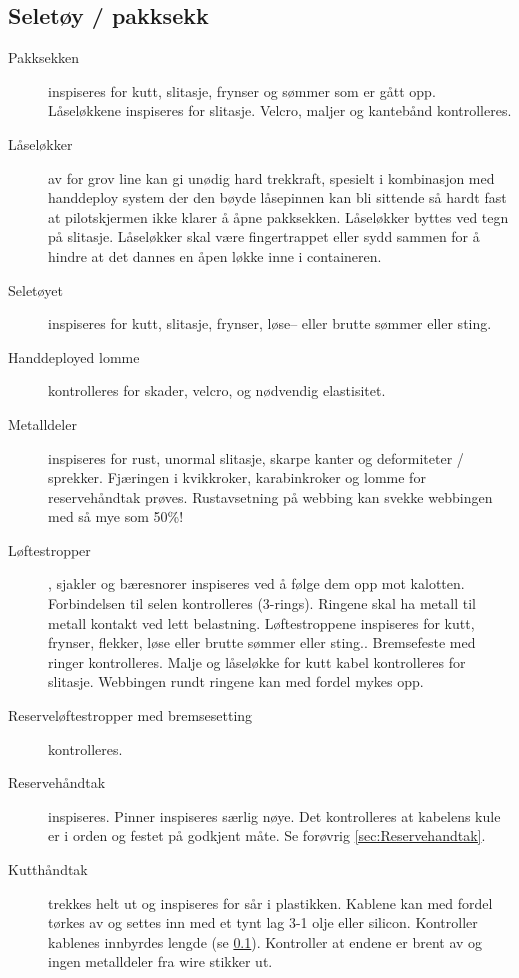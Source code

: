 \subsection{Seletøy / pakksekk}
\label{sec:Seletoy_og_LOR}
\begin{description}
	\item[Pakksekken] inspiseres for kutt, slitasje, frynser og sømmer som er gått opp. Låseløkkene inspiseres for slitasje. Velcro, maljer og kantebånd kontrolleres.

	\item[Låseløkker] av for grov line kan gi unødig hard trekkraft, spesielt i kombinasjon med handdeploy system der den bøyde låsepinnen kan bli sittende så hardt fast at pilotskjermen ikke klarer å åpne pakksekken.
	Låseløkker byttes ved tegn på slitasje. Låseløkker skal være fingertrappet eller sydd sammen for å hindre at det dannes en åpen løkke inne i containeren.

	\item[Seletøyet] inspiseres for kutt, slitasje, frynser, løse– eller brutte sømmer eller sting.

	\item[Handdeployed lomme] kontrolleres for skader, velcro, og nødvendig elastisitet.

	\item[Metalldeler] inspiseres for rust, unormal slitasje, skarpe kanter og deformiteter / sprekker. Fjæringen i kvikkroker, karabinkroker og lomme for reservehåndtak prøves. Rustavsetning på webbing kan svekke webbingen med så mye som 50\%!

	\item[Løftestropper], sjakler og bæresnorer inspiseres ved å følge dem opp mot kalotten. Forbindelsen til selen kontrolleres (3-rings). Ringene skal ha metall til metall kontakt ved lett belastning. Løftestroppene inspiseres for kutt, frynser, flekker, løse eller brutte sømmer eller sting.. Bremsefeste med ringer kontrolleres. Malje og låseløkke for kutt kabel kontrolleres for slitasje. Webbingen rundt ringene kan med fordel mykes opp.

	\item[Reserveløftestropper med bremsesetting] kontrolleres.

	\item[Reservehåndtak] inspiseres. Pinner inspiseres særlig nøye. Det kontrolleres at kabelens kule er i orden og festet på godkjent måte. Se forøvrig \ref{sec:Reservehandtak}.

	\item[Kutthåndtak] trekkes helt ut og inspiseres for sår i plastikken. Kablene kan med fordel tørkes av og settes inn med et tynt lag 3-1 olje eller silicon. Kontroller kablenes innbyrdes lengde (se \ref{sec:Seletoy_og_LOR}). Kontroller at endene er brent av og ingen metalldeler fra wire stikker ut.


\end{description}
